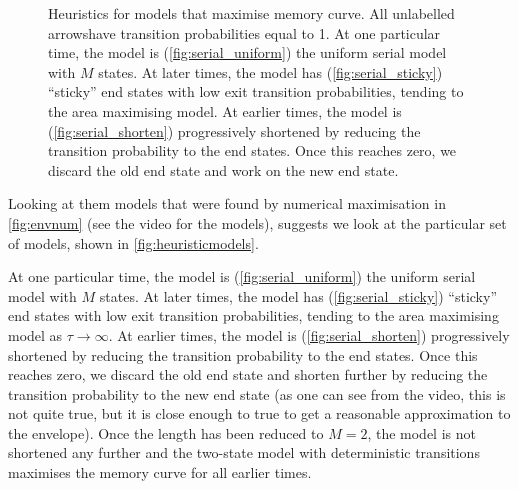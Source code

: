 \documentclass[12pt]{article}
\begin{document}
\begin{figure}[tb]
  \centering
  \begin{myenuma}
    \item{}\hspace{0.02\linewidth}\label{fig:serial_uniform}
    \item{}\hspace{0.02\linewidth}\label{fig:serial_sticky}
    \item{}\label{fig:serial_shorten}
  \end{myenuma}
  \caption[Heuristic optimal models]{Heuristics for models that maximise memory curve.
  All unlabelled arrowshave transition probabilities equal to 1.
  At one particular time, the model is (\ref{fig:serial_uniform}) the uniform serial model with $M$ states.
  At later times, the model has (\ref{fig:serial_sticky}) ``sticky'' end states with low exit transition probabilities, tending to the area maximising model. 
  At earlier times, the model is (\ref{fig:serial_shorten}) progressively shortened by reducing the transition probability to the end states. 
  Once this reaches zero, we discard the old end state and work on the new end state.} \label{fig:heuristicmodels}
\end{figure}


Looking at them models that were found by numerical maximisation in \autoref{fig:envnum} (see the video for the models), suggests we look at the particular set of models, shown in \autoref{fig:heuristicmodels}.

At one particular time, the model is (\ref{fig:serial_uniform}) the uniform serial model with $M$ states.
At later times, the model has (\ref{fig:serial_sticky}) ``sticky'' end states with low exit transition probabilities, tending to the area maximising model as $\tau\to\infty$.
At earlier times, the model is (\ref{fig:serial_shorten}) progressively shortened by reducing the transition probability to the end states.
Once this reaches zero, we discard the old end state and shorten further by reducing the transition probability to the new end state (as one can see from the video, this is not quite true, but it is close enough to true to get a reasonable approximation to the envelope).
Once the length has been reduced to $M=2$, the model is not shortened any further and the two-state model with deterministic transitions maximises the memory curve for all earlier times.
\end{document}
